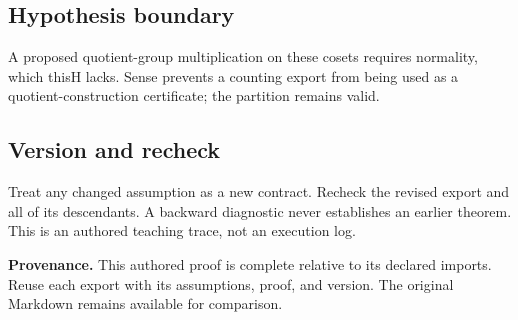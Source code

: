 \documentclass[preprint,12pt,aps,pra,showkeys,amsmath,amssymb,superscriptaddress,floatfix]{revtex4-2}
\theoremstyle{definition}
\theoremstyle{remark}
\begin{document}
\subsection{Hypothesis boundary}
A proposed quotient-group multiplication on these cosets requires
normality, which thisH lacks. Sense prevents a counting export from
being used as a quotient-construction certificate; the partition remains
valid.

\subsection{Version and recheck}
Treat any changed assumption as a new contract. Recheck the revised
export and all of its descendants. A backward diagnostic never
establishes an earlier theorem. This is an authored teaching trace, not
an execution log.

\par\medskip\begingroup\small\linespread{1.0}\selectfont\noindent\textbf{Provenance.} This authored proof is complete relative to its declared imports. Reuse
each export with its assumptions, proof, and version. The original
Markdown remains available for comparison.
\par\endgroup
\end{document}
